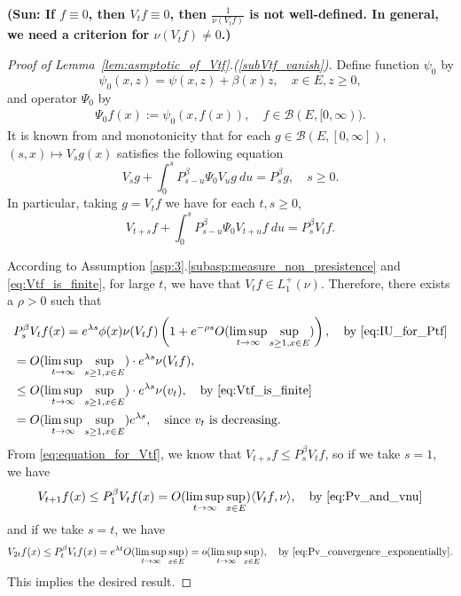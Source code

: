 \documentclass[12pt,a4paper]{amsart}
\numberwithin{equation}{section}
\theoremstyle{plain}
\theoremstyle{definition}
\begin{document}
{\bf (Sun: If $f \equiv 0$, then $V_tf \equiv  0$, then $\frac{1}{\nu(V_tf)}$ is not well-defined. In general, we need a criterion for $\nu(V_tf) \neq 0$.)}

\begin{proof}[Proof of Lemma~\ref{lem:asmptotic_of_Vtf}.(\ref{subVtf_vanish})]
Define function $\psi_0$ by
\[
  \psi_0(x,z) = \psi(x,z)+ \beta(x) z,
  \quad x\in E, z \geq 0,
\]
and operator $\Psi_0$ by
\begin{align}
\Psi_0f(x):=\psi_0(x,f(x)), \quad f\in \mathcal B(E,[0,\infty)).
\end{align}
It is known from \cite[Theorem 2.23]{Li2011Measurevalued} and monotonicity that for each $g \in \mathcal B(E,[0,\infty])$, $(s,x)\mapsto V_sg(x)$ satisfies the following equation
\[
  V_sg + \int_0^s P_{s-u}^\beta \Psi_0V_u g~du = P_s^\beta g,
  \quad s\geq 0.
\]
In particular, taking $g=V_tf$ we have for each $t,s \geq 0$,
\begin{equation}
  \label{eq:equation_for_Vtf}
  V_{t+s}f + \int_0^s P^\beta_{s-u}\Psi_0V_{t+u}f~du
  =P^\beta_s V_t f.
\end{equation}

According to Assumption \ref{asp:3}.\eqref{subasp:measure_non_presistence} and \eqref{eq:Vtf_is_finite}, for large $t$, we have that $V_tf \in L^+_1(\nu)$.
Therefore, there exists a $\rho > 0$ such that
\begin{align}
  &P_s^\beta V_t f(x) = e^{\lambda s} \phi(x) \nu(V_tf) \left (1+e^{-\rho s}O(\limsup_{t\to \infty}\sup_{s\geq 1,x\in E})\right),
    \quad\text{by~\eqref{eq:IU_for_Ptf}} \label{eq:asmptotic_for_PsVtf}
  \\&= O(\limsup_{t\to \infty}\sup_{s\geq 1, x\in E}) \cdot e^{\lambda s} \nu(V_tf),
  \label{eq:Pv_and_vnu}
  \\&\leq O(\limsup_{t\to \infty} \sup_{s\geq 1, x\in E}) \cdot e^{\lambda s} \nu(v_t),
  \quad\text{by~\eqref{eq:Vtf_is_finite}}
  \\&= O(\limsup_{t\to \infty}\sup_{s\geq 1, x\in E}) e^{\lambda s},\quad\text{since $v_t$ is decreasing}. \label{eq:Pv_convergence_exponentially}
\end{align}
From \eqref{eq:equation_for_Vtf}, we know that $V_{t+s} f \leq P_s^\beta V_t f$, so if we take $s = 1$, we have
\begin{align}
\label{eq:VtPlusOnef_leq_Vtfnu}
V_{t+1}f(x) \leq P_1^\beta V_t f(x) = O(\limsup_{t
  \to \infty}\sup_{x\in E}) \langle V_tf,\nu\rangle,\quad\text{by~\eqref{eq:Pv_and_vnu}} 
\end{align}
and if we take $s = t$, we have
\begin{align}
\label{eq:Vtf_convergence_to_zero}
V_{2t}f(x) 
\leq P_t^\beta V_tf(x)
= e^{\lambda t} O(\limsup_{t\to \infty} \sup_{x\in E})
  = o(\limsup_{t\to \infty} \sup_{x\in E}),\quad\text{by~\eqref{eq:Pv_convergence_exponentially}}.
\end{align}
This implies the desired result.
\end{proof}
\end{document}
